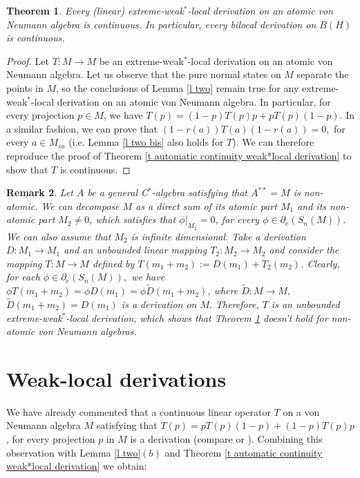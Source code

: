 \documentclass[11pt]{amsart}
\newtheorem{theorem}{Theorem}[section]
\newtheorem{remark}[theorem]{Remark}
\begin{document}
\begin{theorem}\label{t automatic continuity extreme-weak*local derivation} Every (linear) extreme-weak$^*$-local derivation on an atomic von Neumann algebra is continuous. In particular, every bilocal derivation on $B(H)$ is continuous.
\end{theorem}

\begin{proof} Let $T:M\to M$ be an extreme-weak$^*$-local derivation on an atomic von Neumann algebra. Let us observe that the pure normal states on $M$ separate the points in $M$, so the conclusions of Lemma \ref{l two} remain true for any extreme-weak$^*$-local derivation on an atomic von Neumann algebra. In particular, for every projection $p\in M$, we have $T(p) = (1-p) T(p) p + p T(p) (1-p).$ In a similar fashion, we can prove that $(1-r(a)) T(a) (1-r(a)) = 0,$ for every $a\in M_{sa}$ (i.e. Lemma \ref{l two bis} also holds for $T$). We can therefore reproduce the proof of Theorem \ref{t automatic continuity weak*local derivation} to show that $T$ is continuous.\end{proof}

\begin{remark}\label{remark counterexample in the non atomic setting} Let $A$ be a general C$^*$-algebra satisfying that $A^{**}=M$ is non-atomic. We can decompose $M$ as a direct sum of its atomic part $M_1$ and its non-atomic part $M_2\neq 0$, which satisfies that $\phi|_{M_2} =0$, for every $\phi \in \partial_{e} (S_n(M)).$ We can also assume that $M_2$ is infinite dimensional. Take a derivation $D : M_1\to M_1$ and an unbounded linear mapping $T_2 : M_2\to M_2$ and consider the mapping $T: M\to M$ defined by $T(m_1+m_2):= D (m_1) + T_2 (m_2)$. Clearly, for each $\phi\in \partial_{e} (S_n(M)),$ we have $\phi T(m_1 +m_2) =\phi D(m_1)= \phi \widetilde{D} (m_1+m_2)$, where $\widetilde{D}: M\to M,$ $\widetilde{D} (m_1+m_2) = D(m_1)$ is a derivation on $M.$ Therefore, $T$ is an unbounded extreme-weak$^*$-local derivation, which shows that Theorem \ref{t automatic continuity extreme-weak*local derivation} doesn't hold for non-atomic von Neumann algebras.
\end{remark}

\section{Weak-local derivations}\label{sec: weak local derivations}

We have already commented that a continuous linear operator $T$ on a von Neumann algebra $M$ satisfying that $T(p) = p T(p) (1-p) + (1-p) T(p) p$, for every projection $p$ in $M$ is a derivation (compare \cite[Theorem 2]{Bre92} or \cite[Theorem 2.1]{AyuKudPe2014}). Combining this observation with Lemma \ref{l two}$(b)$ and Theorem \ref{t automatic continuity weak*local derivation} we obtain:
\end{document}
